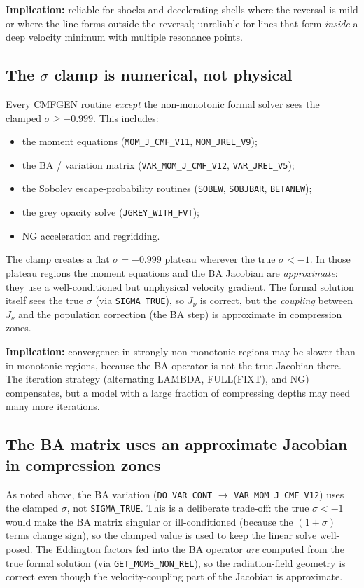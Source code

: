 \documentclass[11pt]{article}
\begin{document}
\textbf{Implication:} reliable for shocks and decelerating shells where
the reversal is mild or where the line forms outside the reversal;
unreliable for lines that form \emph{inside} a deep velocity minimum
with multiple resonance points.

\subsection{The \texorpdfstring{$\sigma$}{sigma} clamp is numerical, not physical}

Every CMFGEN routine \emph{except} the non-monotonic formal solver sees
the clamped $\sigma \ge -0.999$.  This includes:
\begin{itemize}[nosep]
  \item the moment equations (\texttt{MOM\_J\_CMF\_V11},
        \texttt{MOM\_JREL\_V9});
  \item the BA / variation matrix (\texttt{VAR\_MOM\_J\_CMF\_V12},
        \texttt{VAR\_JREL\_V5});
  \item the Sobolev escape-probability routines (\texttt{SOBEW},
        \texttt{SOBJBAR}, \texttt{BETANEW});
  \item the grey opacity solve (\texttt{JGREY\_WITH\_FVT});
  \item NG acceleration and regridding.
\end{itemize}
The clamp creates a flat $\sigma = -0.999$ plateau wherever the true
$\sigma < -1$.  In those plateau regions the moment equations and the
BA Jacobian are \emph{approximate}: they use a well-conditioned but
unphysical velocity gradient.  The formal solution itself sees the true
$\sigma$ (via \texttt{SIGMA\_TRUE}), so $J_\nu$ is correct, but the
\emph{coupling} between $J_\nu$ and the population correction (the BA
step) is approximate in compression zones.

\textbf{Implication:} convergence in strongly non-monotonic regions may
be slower than in monotonic regions, because the BA operator is not the
true Jacobian there.  The iteration strategy (alternating LAMBDA,
FULL(FIXT), and NG) compensates, but a model with a large fraction of
compressing depths may need many more iterations.

\subsection{The BA matrix uses an approximate Jacobian in compression zones}

As noted above, the BA variation (\texttt{DO\_VAR\_CONT} $\to$
\texttt{VAR\_MOM\_J\_CMF\_V12}) uses the clamped $\sigma$, not
\texttt{SIGMA\_TRUE}.  This is a deliberate trade-off: the true
$\sigma < -1$ would make the BA matrix singular or ill-conditioned
(because the $(1 + \sigma)$ terms change sign), so the clamped value is
used to keep the linear solve well-posed.  The Eddington factors fed
into the BA operator \emph{are} computed from the true formal solution
(via \texttt{GET\_MOMS\_NON\_REL}), so the radiation-field geometry is
correct even though the velocity-coupling part of the Jacobian is
approximate.
\end{document}

